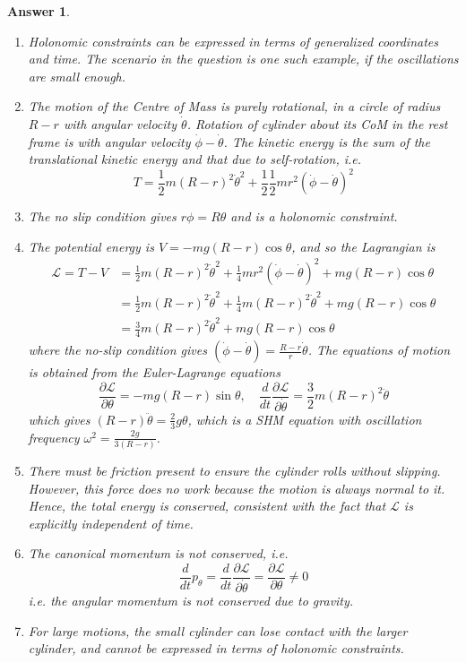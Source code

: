 \documentclass[a4paper]{article}
\newtheorem{ans}{Answer}[section]
\theoremstyle{new}
\begin{document}
\begin{ans}\leavevmode
\begin{enumerate}[label=(\alph*)]
\item Holonomic constraints can be expressed in terms of generalized coordinates and time. The scenario in the question is one such example, if the oscillations are small enough.
\item The motion of the Centre of Mass is purely rotational, in a circle of radius $R-r$ with angular velocity $\dot{\theta}$. Rotation of cylinder about its CoM in the rest frame is with angular velocity $\dot{\phi}-\dot{\theta}$. The kinetic energy is the sum of the translational kinetic energy and that due to self-rotation, i.e.
$$T=\frac{1}{2}m(R-r)^2\dot{\theta}^2+\frac{1}{2}\frac{1}{2}mr^2(\dot{\phi}-\dot{\theta})^2$$
\item The no slip condition gives $r\phi=R\theta$ and is a holonomic constraint.
\item The potential energy is $V=-mg(R-r)\cos\theta$, and so the Lagrangian is
\begin{align}
\mathcal{L}=T-V&=\frac{1}{2}m(R-r)^2\dot{\theta}^2+\frac{1}{4}mr^2(\dot{\phi}-\dot{\theta})^2+mg(R-r)\cos\theta\nonumber\\&=\frac{1}{2}m(R-r)^2\dot{\theta}^2+\frac{1}{4}m(R-r)^2\dot{\theta}^2+mg(R-r)\cos\theta\nonumber\\&=\frac{3}{4}m(R-r)^2\dot{\theta}^2+mg(R-r)\cos\theta\nonumber
\end{align}
where the no-slip condition gives $(\dot{\phi}-\dot{\theta})=\frac{R-r}{r}\dot{\theta}$. The equations of motion is obtained from the Euler-Lagrange equations
$$\frac{\partial\mathcal{L}}{\partial\theta}=-mg(R-r)\sin\theta,\quad\frac{d}{dt}\frac{\partial\mathcal{L}}{\partial\dot{\theta}}=\frac{3}{2}m(R-r)^2\ddot{\theta}$$
which gives $(R-r)\ddot{\theta}=\frac{2}{3}g\theta$, which is a SHM equation with oscillation frequency $\omega^2=\frac{2g}{3(R-r)}$.
\item There must be friction present to ensure the cylinder rolls without slipping. However, this force does no work because the motion is always normal to it. Hence, the total energy is conserved, consistent with the fact that $\mathcal{L}$ is explicitly independent of time.
\item The canonical momentum is not conserved, i.e.
$$\frac{d}{dt}p_\theta=\frac{d}{dt}\frac{\partial\mathcal{L}}{\partial\dot{\theta}}=\frac{\partial\mathcal{L}}{\partial\theta}\neq 0$$
i.e. the angular momentum is not conserved due to gravity.
\item For large motions, the small cylinder can lose contact with the larger cylinder, and cannot be expressed in terms of holonomic constraints.
\end{enumerate}
\end{ans}
\end{document}
